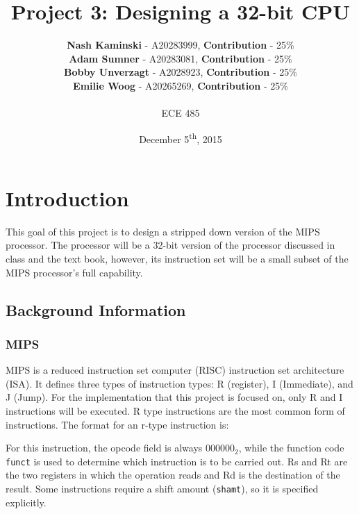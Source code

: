 \documentclass[12pt]{article}
\title{\textbf{Project 3: Designing a 32-bit CPU}}
\author{\textbf{Nash Kaminski} - A20283999, \textbf{Contribution} - 25\% \\
	\textbf{Adam Sumner} - A20283081, \textbf{Contribution} - 25\% \\
		\textbf{Bobby Unverzagt} - A2028923, \textbf{Contribution} - 25\% \\
		\textbf{Emilie Woog} - A20265269, \textbf{Contribution} - 25\% \\
		 ~\\ ECE 485}
\date{December 5\textsuperscript{th}, 2015}
\begin{document}
\maketitle

\section{Introduction}
This goal of this project is to design a stripped down version of the MIPS processor. The processor will be a 32-bit version of the processor discussed in class and the text book, however, its instruction set will be a small subset of the MIPS processor's full capability. 

\subsection{Background Information}
\subsubsection{MIPS}
MIPS is a reduced instruction set computer (RISC) instruction set architecture (ISA). It defines three types of instruction types: R (register), I (Immediate), and J (Jump). For the implementation that this project is focused on, only R and I instructions will be executed. R type instructions are the most common form of instructions. The format for an r-type instruction is:

\begin{center}

\end{center}

\noindent For this instruction, the opcode field is always $000000_2$, while the function code \texttt{funct} is used to determine which instruction is to be carried out. Rs and Rt are the two registers in which the operation reads and Rd is the destination of the result. Some instructions require a shift amount (\texttt{shamt}), so it is specified explicitly.
\\
\end{document}
